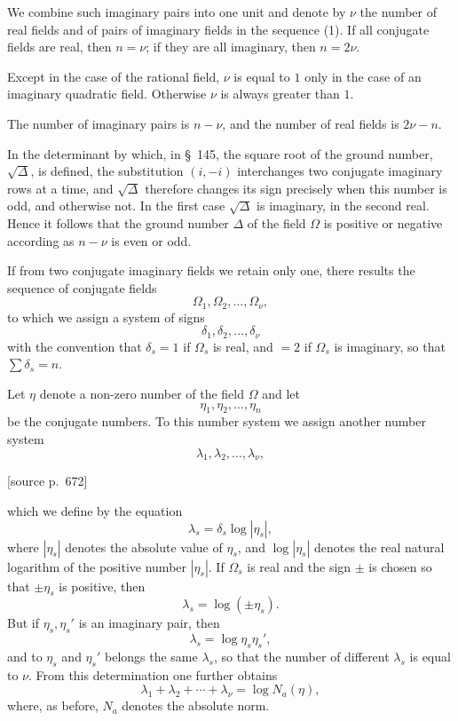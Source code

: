 \documentclass[11pt]{article}
\newcommand{\srcpage}[1]{\par\medskip\noindent\textsf{[source p.~#1]}\par\smallskip}
\begin{document}
We combine such imaginary pairs into one unit and denote by $\nu$ the number of real fields and of pairs of imaginary fields in the sequence (1). If all conjugate fields are real, then $n=\nu$; if they are all imaginary, then $n=2\nu$.

Except in the case of the rational field, $\nu$ is equal to $1$ only in the case of an imaginary quadratic field. Otherwise $\nu$ is always greater than $1$.

The number of imaginary pairs is $n-\nu$, and the number of real fields is $2\nu-n$.

In the determinant by which, in \S~145, the square root of the ground number, $\sqrt{\Delta}$, is defined, the substitution $(i,-i)$ interchanges two conjugate imaginary rows at a time, and $\sqrt{\Delta}$ therefore changes its sign precisely when this number is odd, and otherwise not. In the first case $\sqrt{\Delta}$ is imaginary, in the second real. Hence it follows that the ground number $\Delta$ of the field $\Omega$ is positive or negative according as $n-\nu$ is even or odd.

If from two conjugate imaginary fields we retain only one, there results the sequence of conjugate fields
\[
\Omega_1,\Omega_2,\ldots,\Omega_\nu,
\]
to which we assign a system of signs
\[
\delta_1,\delta_2,\ldots,\delta_\nu
\]
with the convention that $\delta_s=1$ if $\Omega_s$ is real, and $=2$ if $\Omega_s$ is imaginary, so that $\sum \delta_s=n$.

Let $\eta$ denote a non-zero number of the field $\Omega$ and let
\[
\eta_1,\eta_2,\ldots,\eta_n
\]
be the conjugate numbers. To this number system we assign another number system
\[
\lambda_1,\lambda_2,\ldots,\lambda_\nu,
\]
\srcpage{672}
which we define by the equation
\begin{equation}
\lambda_s=\delta_s\log |\eta_s|,
\tag{2}
\end{equation}
where $|\eta_s|$ denotes the absolute value of $\eta_s$, and $\log|\eta_s|$ denotes the real natural logarithm of the positive number $|\eta_s|$. If $\Omega_s$ is real and the sign $\pm$ is chosen so that $\pm\eta_s$ is positive, then
\[
\lambda_s=\log(\pm\eta_s).
\]
But if $\eta_s,\eta_s'$ is an imaginary pair, then
\[
\lambda_s=\log\eta_s\eta_s',
\]
and to $\eta_s$ and $\eta_s'$ belongs the same $\lambda_s$, so that the number of different $\lambda_s$ is equal to $\nu$. From this determination one further obtains
\begin{equation}
\lambda_1+\lambda_2+\cdots+\lambda_\nu=\log N_a(\eta),
\tag{3}
\end{equation}
where, as before, $N_a$ denotes the absolute norm.
\end{document}
